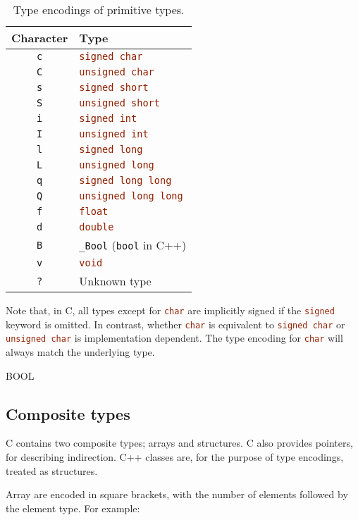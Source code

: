 \documentclass[a4paper]{report}
\newcommand{\ccode}[1]{\lstinline[language={C}]{#1}}
\begin{document}
\begin{table}
	\begin{center}
		\begin{tabular}{c|l}
			Character & Type\\\hline
			\texttt{c} & \ccode{signed char} \\
			\texttt{C} & \ccode{unsigned char} \\
			\texttt{s} & \ccode{signed short} \\
			\texttt{S} & \ccode{unsigned short} \\
			\texttt{i} & \ccode{signed int} \\
			\texttt{I} & \ccode{unsigned int} \\
			\texttt{l} & \ccode{signed long} \\
			\texttt{L} & \ccode{unsigned long} \\
			\texttt{q} & \ccode{signed long long} \\
			\texttt{Q} & \ccode{unsigned long long} \\
			\texttt{f} & \ccode{float} \\
			\texttt{d} & \ccode{double} \\
			\texttt{B} & \ccode{_Bool} (\ccode{bool} in C++)\\
			\texttt{v} & \ccode{void}\\
			\texttt{?} & Unknown type
		\end{tabular}
		\caption{\label{tab:primencode}Type encodings of primitive types.}
	\end{center}
\end{table}

Note that, in C, all types except for \ccode{char} are implicitly signed if the \ccode{signed} keyword is omitted.
In contrast, whether \ccode{char} is equivalent to \ccode{signed char} or \ccode{unsigned char} is implementation dependent.
The type encoding for \ccode{char} will always match the underlying type.

BOOL

\subsection{Composite types}

C contains two composite types; arrays and structures.
C also provides pointers, for describing indirection.
C++ classes are, for the purpose of type encodings, treated as structures.

Array are encoded in square brackets, with the number of elements followed by the element type.
For example:
\end{document}
